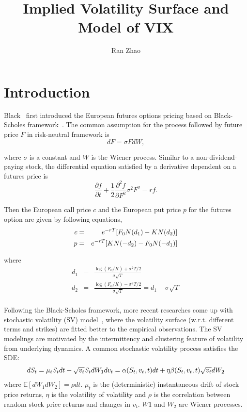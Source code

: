 \documentclass[11pt,reqno,final]{amsart}
\title{Implied Volatility Surface and Model of VIX}
\author{Ran Zhao}
\begin{document}
\begin{abstract}

\end{abstract}

\maketitle
%
%
%
\section{Introduction}
Black~\cite{Black76} first introduced the European futures options pricing based on Black-Scholes framework~\cite{BS73}. The common assumption for the process followed by future price $F$ in risk-neutral framework is
\begin{equation}
dF=\sigma F dW,
\end{equation}

where $\sigma$ is a constant and $W$ is the Wiener process. Similar to a non-dividend-paying stock, the differential equation satisfied by a derivative dependent on a futures price is
$$
\frac{\partial f}{\partial t} + \frac{1}{2} \frac{\partial^2 f}{\partial F^2} \sigma^2 F^2 = rf.
$$

Then the European call price $c$ and the European put price $p$ for the futures option are given by following equations,
\begin{eqnarray}
c &=& e^{-rT}[F_0 N(d_1) - KN(d_2)]  \label{eqn::future_bs} \\
p &=& e^{-rT}[K N(-d_2) - F_0 N(-d_1)] \notag \\
\end{eqnarray}

where
\begin{eqnarray*}
d_1 &=& \frac{\log(F_0/K) + \sigma^2T/2}{\sigma\sqrt{T}} \\
d_2 &=& \frac{\log(F_0/K) - \sigma^2T/2}{\sigma\sqrt{T}} = d_1 -\sigma\sqrt{T} \\
\end{eqnarray*}

Following the Black-Scholes framework, more recent researches come up with stochastic volatility (SV) model~\cite{Heston93,Bates96,DPS00}, where the volatility surface (w.r.t. different terms and strikes) are fitted better to the empirical observations. The SV modelings are motivated by the intermittency and clustering feature of volatility from underlying dynamics. A common stochastic volatility process satisfies the SDE:
\begin{equation*}
dS_t = \mu_t S_t dt + \sqrt{v_t} S_t dW_1 \\
dv_t = \alpha(S_t,v_t,t)dt + \eta\beta(S_t,v_t,t)\sqrt{v_t} dW_2
\end{equation*}
where $\mathbb{E}[dW_1 dW_2]=\rho dt$. $\mu_t$ is the (deterministic) instantaneous drift of stock price returns, $\eta$ is the volatility of volatility and $\rho$ is the correlation between random stock price returns and changes in $v_t$. $W1$ and $W_2$ are Wiener processes.
\end{document}
